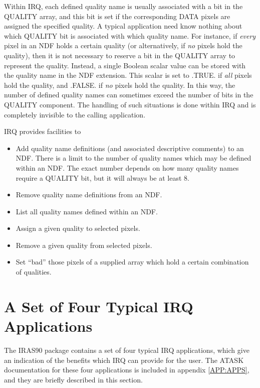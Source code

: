 Within IRQ, each defined quality name is usually associated with a bit in the
QUALITY array, and this bit is set if the corresponding DATA pixels are assigned
the specified quality. A typical application need know nothing about which
QUALITY bit is associated with which quality name. For instance, if {\em every}
pixel in an NDF holds a certain quality (or alternatively, if {\em no} pixels
hold the quality), then it is not necessary to reserve a bit in the QUALITY
array to represent the quality. Instead, a single Boolean scalar value can be
stored with the quality name in the NDF extension. This scalar is set to .TRUE.
if {\em all} pixels hold the quality, and .FALSE. if {\em no} pixels hold the
quality. In this way, the number of defined quality names can sometimes exceed
the number of bits in the QUALITY component. The handling of such situations is
done within IRQ and is completely invisible to the calling application. 

IRQ provides facilities to 
\begin{itemize}
\item Add quality name definitions (and associated descriptive comments) to an
NDF. There is a limit to the number of quality names which may be defined within
an NDF. The exact number depends on how many quality names require a QUALITY
bit, but it will always be at least 8. 
\item Remove quality name definitions from an NDF.
\item List all quality names defined within an NDF.
\item Assign a given quality to selected pixels.
\item Remove a given quality from selected pixels.
\item Set ``bad'' those pixels of a supplied array which hold a certain 
combination of qualities.
\end{itemize}

\section {A Set of Four Typical IRQ Applications}
The IRAS90 package contains a set of four typical IRQ applications, which give
an indication of the benefits which IRQ can provide for the user. The ATASK
documentation for these four applications is included in appendix
\ref{APP:APPS}, and they are briefly described in this section. 
